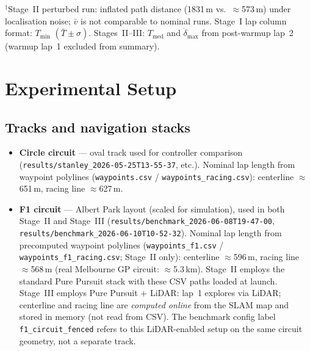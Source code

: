 \documentclass[11pt,a4paper]{article}
\newcommand{\runref}[1]{\texttt{results/#1}}
\begin{document}
\medskip
\noindent\footnotesize
$^{\dag}$Stage~II perturbed run: inflated path distance (1831\,m vs.\ $\approx$573\,m)
under localisation noise; $\bar{v}$ is not comparable to nominal runs.
Stage~I lap column format: $T_{\min}$ $(\bar{T}\pm\sigma)$.
Stages~II--III: $T_{\mathrm{med}}$ and $\dot{\delta}_{\max}$ from post-warmup lap~2
(warmup lap~1 excluded from summary).
\medskip

\section{Experimental Setup}
\label{sec:setup}

\subsection{Tracks and navigation stacks}
\begin{itemize}[nosep]
  \item \textbf{Circle circuit} --- oval track used for controller comparison
        (\runref{stanley\_2026-05-25T13-55-37}, etc.).
        Nominal lap length from waypoint polylines
        (\texttt{waypoints.csv} / \texttt{waypoints\_racing.csv}):
        centerline ${\approx}$651\,m, racing line ${\approx}$627\,m.
  \item \textbf{F1 circuit} --- Albert Park layout (scaled for simulation), used in
        both Stage~II and Stage~III
        (\runref{benchmark\_2026-06-08T19-47-00},
        \runref{benchmark\_2026-06-10T10-52-32}).
        Nominal lap length from precomputed waypoint polylines
        (\texttt{waypoints\_f1.csv} / \texttt{waypoints\_f1\_racing.csv};
        Stage~II only):
        centerline ${\approx}$596\,m, racing line ${\approx}$568\,m
        (real Melbourne GP circuit: ${\approx}$5.3\,km).
        Stage~II employs the standard Pure Pursuit stack with these CSV paths
        loaded at launch.
        Stage~III employs Pure Pursuit + LiDAR: lap~1 explores via LiDAR;
        centerline and racing line are \emph{computed online} from the SLAM map
        and stored in memory (not read from CSV).
        The benchmark config label \texttt{f1\_circuit\_fenced} refers to this
        LiDAR-enabled setup on the same circuit geometry, not a separate track.
\end{itemize}
\end{document}
